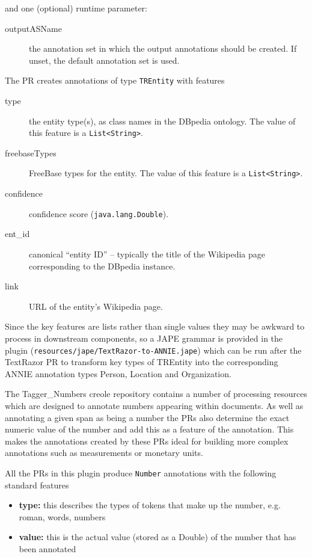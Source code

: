 and one (optional) runtime parameter:
\begin{description}
\item[outputASName] the annotation set in which the output annotations should
  be created.  If unset, the default annotation set is used.
\end{description}

The PR creates annotations of type \verb!TREntity! with features
\begin{description}
\item[type] the entity type(s), as class names in the DBpedia ontology.  The
  value of this feature is a \verb!List<String>!.
\item[freebaseTypes] FreeBase types for the entity.  The value of this feature
  is a \verb!List<String>!.
\item[confidence] confidence score (\verb!java.lang.Double!).
\item[ent\_id] canonical ``entity ID'' -- typically the title of the Wikipedia
  page corresponding to the DBpedia instance.
\item[link] URL of the entity's Wikipedia page.
\end{description}

Since the key features are lists rather than single values they may be awkward
to process in downstream components, so a JAPE grammar is provided in the
plugin (\verb!resources/jape/TextRazor-to-ANNIE.jape!) which can be run after
the TextRazor PR to transform key types of TREntity into the corresponding
ANNIE annotation types Person, Location and Organization.


The Tagger\_Numbers creole repository contains a number of processing resources
which are designed to annotate numbers appearing within documents.
As well as annotating a given span as being a number the PRs also determine the
exact numeric value of the number and add this as a feature of the annotation.
This makes the annotations created by these PRs ideal for building more complex
annotations such as measurements or monetary units.

All the PRs in this plugin produce \texttt{Number} annotations with the
following standard features

\begin{itemize}
\item \textbf{type:} this describes the types of tokens that make up the number,
e.g. roman, words, numbers
\item \textbf{value:} this is the actual value (stored as a Double) of the
number that has been annotated
\end{itemize}

